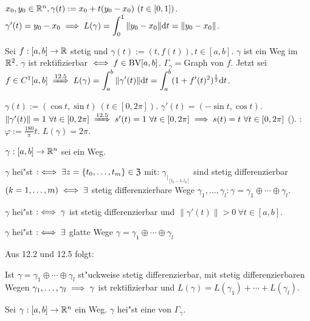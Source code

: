 \documentclass[a4paper,twoside,DIV15,BCOR12mm,chapterprefix=true,headings=twolinechapter]{scrbook}
\begin{document}
\begin{beispiele}
\item $x_0, y_0\in\mathbb{R}^n, \gamma(t):=x_0+t(y_0-x_0)\ (t\in [0,1])$. $\gamma'(t)=y_0-x_0\implies L(\gamma)=\displaystyle\int_0^1\|y_0-x_0\|\text{d}t=\|y_0-x_0\|$.
\item Sei $f:[a,b]\to\mathbb{R}$ stetig und $\gamma(t):=(t, f(t)), t\in[a,b]$. $\gamma$ ist ein Weg im $\mathbb{R}^2$. $\gamma$ ist rektifizierbar $\iff f \in \text{BV}[a,b]$. $\Gamma_\gamma=$Graph von $f$. Jetzt sei $f\in C^1[a,b] \folgtnach{12.5} L(\gamma)=\ds\int_a^b\|\gamma'(t)\|\text{d}t=\ds\int_a^b (1+f'(t)^2)^{\frac{1}{2}}\text{d}t$.
\item $\gamma(t):=(\cos t, \sin t)\ (t\in [0,2\pi])$. $\gamma'(t)=(-\sin t, \cos t)$. $\|\gamma'(t)\|=1\ \forall t\in [0,2\pi]\folgtnach{12.5}s'(t)=1\ \forall t\in[0,2\pi]\folgt s(t)=t\ \forall t\in[0,2\pi]$ (). : $\varphi:=\frac{180}{\pi}t$. $L(\gamma)=2\pi$.
\end{beispiele}

\begin{definition*}
$\gamma:[a,b]\to\mathbb{R}^n$ sei ein Weg.
\begin{liste}
\item $\gamma$ hei"st  $:\iff\exists z=\{t_0,\ldots,t_m\}\in\mathfrak{Z}$ mit: $\gamma_{|_{[t_k-1,t_k]}}$ sind stetig differenzierbar $(k=1,\ldots,m)\iff\exists$ stetig differenzierbare Wege $\gamma_1,\ldots,\gamma_l: \gamma=\gamma_1\oplus\cdots\oplus\gamma_l$.
\item $\gamma$ hei"st  $:\iff \gamma$ ist stetig differenzierbar und $\|\gamma'(t)\|>0\ \forall t\in[a,b]$.
\item $\gamma$ hei"st  $:\iff\exists$ glatte Wege $\gamma=\gamma_1\oplus\cdots\oplus\gamma_l$
\end{liste}
\end{definition*}

Aus 12.2 und 12.5 folgt:

\begin{satz}
Ist $\gamma=\gamma_1\oplus\cdots\oplus\gamma_l$ st"uckweise stetig differenzierbar, mit stetig differenzierbaren Wegen $\gamma_1,\ldots,\gamma_l\implies \gamma$ ist rektifizierbar und $L(\gamma)=L(\gamma_1)+\cdots+L(\gamma_l)$.
\end{satz}

\begin{definition*}
Sei $\gamma:[a,b]\to\mathbb{R}^n$ ein Weg. $\gamma$ hei"st eine  von $\Gamma_\gamma$.
\end{definition*}
\end{document}
